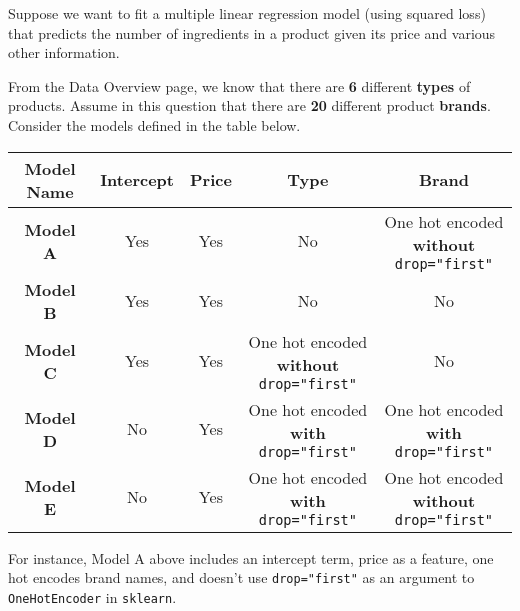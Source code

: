 \documentclass[twoside,12pt]{article}
\begin{document}
\begin{probset}
\begin{prob}[(8 pts)]
\begin{subprobset}
\begin{subprob}
\end{subprob}

\end{subprobset}
    
\end{prob}

\newpage

\begin{prob}[(8 pts)]

Suppose we want to fit a multiple linear regression model (using squared loss) that predicts the number of ingredients in a product given its price and various other information.

From the Data Overview page, we know that there are \textbf{6} different \textbf{types} of products. Assume in this question that there are \textbf{20} different product \textbf{brands}. Consider the models defined in the table below.

\begin{table}[h!]
\centering
\renewcommand{\arraystretch}{1}
\setlength{\tabcolsep}{8pt}
\begin{tabular}{|c|c|c|c|c|}
\hline
\textbf{Model Name} & \textbf{Intercept} & \textbf{Price} & \textbf{Type} & \textbf{Brand} \\ \hline
\textbf{Model A} & Yes & Yes & No & \makecell{One hot encoded \\ \textbf{without} \texttt{drop="first"}} \\ \hline
\textbf{Model B} & Yes & Yes & No & No \\ \hline
\textbf{Model C} & Yes & Yes & \makecell{One hot encoded \\ \textbf{without} \texttt{drop="first"}} & No \\ \hline
\textbf{Model D} & No & Yes & \makecell{One hot encoded \\ \textbf{with} \texttt{drop="first"}} & \makecell{One hot encoded \\ \textbf{with} \texttt{drop="first"}} \\ \hline
\textbf{Model E} & No & Yes & \makecell{One hot encoded \\ \textbf{with} \texttt{drop="first"}} & \makecell{One hot encoded \\ \textbf{without} \texttt{drop="first"}} \\ \hline
\end{tabular}
\end{table}

\vspace{-0.1in}

For instance, Model A above includes an intercept term, price as a feature, one hot encodes brand names, and doesn't use \texttt{drop="first"} as an argument to \texttt{OneHotEncoder} in \texttt{sklearn}.


\end{prob}
\end{probset}
\end{document}
